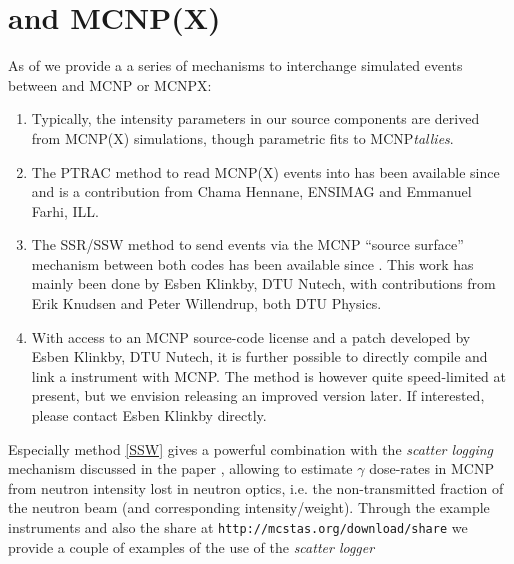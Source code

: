 \section{\MCS and MCNP(X)}

As of  we provide a a series of mechanisms to interchange simulated events
between \MCS and MCNP or MCNPX:
\begin{enumerate}
  \item Typically, the intensity parameters in our \MCS source components are
    derived from MCNP(X) simulations, though parametric fits to MCNP\emph{tallies}.
  \item The PTRAC method to read MCNP(X) events into \MCS has been
    available since  and is a contribution from Chama
    Hennane, ENSIMAG and Emmanuel Farhi, ILL.
  \item The SSR/SSW method to send events via the MCNP ``source
    surface'' mechanism between both codes has been available since
    . This work has mainly been done by Esben Klinkby, DTU
    Nutech, with contributions from Erik Knudsen and Peter Willendrup,
    both DTU Physics. \label{SSW}
  \item With access to an MCNP source-code license and a patch
    developed by Esben Klinkby, DTU Nutech, it is further
    possible to directly compile and link a \MCS instrument with
    MCNP. The method is however quite speed-limited at present, but we
    envision releasing an improved version later. If interested,
    please contact Esben Klinkby directly.
\end{enumerate}
Especially method \ref{SSW} gives a powerful combination with the
\emph{scatter logging} mechanism discussed in the paper
\cite{BergbaeckKnudsen201420}, allowing to estimate $\gamma$ dose-rates
in MCNP from neutron intensity lost in neutron optics, i.e. the non-transmitted
fraction of the \MCS neutron beam (and corresponding
intensity/weight). Through the \MCS example instruments and also the \MCS share at
\verb+http://mcstas.org/download/share+ we provide a couple of
examples of the use of the \emph{scatter logger}

